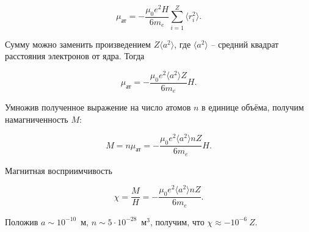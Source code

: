 \begin{equation*}
	\mu_{\text{ат}} = - \frac{\mu_0 e^2 H}{6m_e}\sum\limits_{i=1}^Z \langle r_{i}^2 \rangle.
\end{equation*}

Сумму можно заменить произведением $Z\langle a^2 \rangle$, где $\langle a^2 \rangle$ -- средний квадрат расстояния электронов от ядра. Тогда

\begin{equation*}
	\mu_{\text{ат}} = - \frac{\mu_0 e^2 \langle a^2 \rangle Z}{6m_e}H.
\end{equation*}

Умножив полученное выражение на число атомов $n$ в единице объёма, получим намагниченность $M$:

\begin{equation*}
	M = n\mu_{\text{ат}} = - \frac{\mu_0 e^2 \langle a^2 \rangle nZ}{6m_e}H.
\end{equation*}

Магнитная восприимчивость

\begin{equation*}
	\chi = \frac{M}{H} = - \frac{\mu_0 e^2 \langle a^2 \rangle nZ}{6m_e}.
\end{equation*}

Положив $a \sim 10^{-10}$~м, $n \sim 5 \cdot 10^{-28}$~м$^3$, получим, что $\chi \approx -10^{-6}~Z$.

